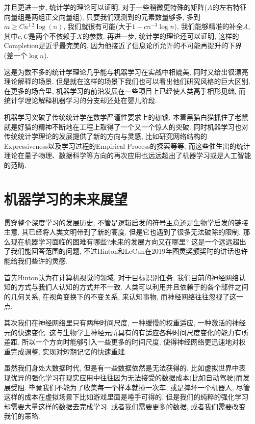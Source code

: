 \documentclass[lang=cn,11pt,a4paper]{elegantpaper}
\begin{document}
 \par 并且更进一步, 统计学的理论可以证明, 对于一些稍微更特殊的矩阵($A$的左右特征向量组是两组正交向量组), 只要我们观测到的元素数量够多, 多到$m\geq C n^{1.2} \log(n)$, 我们就很有可能(大于$1-cn^{-3}\log n$), 我们能够精准的补全$A$, 其中$c,C$是两个不依赖于$X$的参数\cite{Candes2009}. 再进一步, 统计学的理论还可以证明, 这样的Completion是近乎最完美的, 因为他接近了信息论所允许的不可能再提升的下界(差一个$\log n$)\cite{Candes2010}.
\par 这是为数不多的统计学理论几乎能与机器学习在实战中相媲美, 同时又给出很漂亮理论解释的场景. 但是就在这样的场景下我们也可以看出他们研究风格的巨大区别. 在更多的场合里, 机器学习的前沿发展在一些项目上已经使人类高手相形见绌, 而统计学理论解释机器学习的分支却还处在婴儿阶段. 
\par 机器学习突破了传统统计学在数学严谨性要求上的枷锁, 本着黑猫白猫抓住了老鼠就是好猫的精神不断地在工程上取得了一个又一个惊人的突破. 同时机器学习也对传统统计学理论的发展提供了新的方向与灵感, 比如研究网络结构的Expressiveness\cite{Yarotsky2017}以及学习过程的Empirical Process\cite{Vapnik1994}的探索等等, 而这些催生出的统计理论在量子物理、数据科学等方向的再次应用也远远超出了机器学习或是人工智能的范畴.

\section{机器学习的未来展望}

贯穿整个深度学习的发展历史, 不管是逻辑启发的符号主意还是生物学启发的链接主意, 其已经将人类文明带到了新的高度. 但是它也遇到了很多无法破除的限制. 那么现在机器学习面临的困难有哪些?未来的发展方向又在哪里? 这是一个远远超出了我们能回答范围的问题, 不过Hinton和LeCun在2019年图灵奖颁奖时的讲话也许能给我们些许的灵感.

首先Hinton认为\cite{Youtube}在计算机视觉的领域, 对于目标识别任务, 我们目前的神经网络认知的方式与我们人认知的方式并不一致. 人类可以利用并且依赖于的各个部件之间的几何关系, 在视角变换下的不变关系, 来认知事物, 而神经网络往往忽视了这一点. \cite{kosiorek2019stacked}

其次我们在神经网络里只有两种时间尺度, 一种缓慢的权重适应, 一种激活的神经元的快速变化. 这与生物学上神经元所具有的有适应各种时间尺度变化的能力有所差距. 所以一个方向时能够引入一些更多的时间尺度, 使得神经网络更迅速地对权重完成调整, 实现对短期记忆的快速重建. 

虽然我们身处大数据时代, 但是有一些数据依然是无法获得的. 比如虚拟世界中表现优异的强化学习在现实应用中往往因为无法接受的数据成本(比如自动驾驶)而发展受阻. 毕竟我们不能为了收集每一个样本就撞一次车, 或是摔坏一个机器人, 尽管这样的成本在虚拟场景下比如游戏里面是唾手可得的. 但是我们的纯粹的强化学习却需要大量这样的数据去完成学习. 或者我们需要更多的数据, 或者我们需要改变我们的策略.
\end{document}
